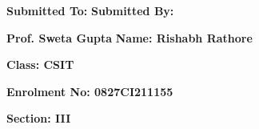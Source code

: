 \documentclass[12pt,,a4paper]{article}
\begin{document}







\vspace*{2cm}

\textbf{\fontsize{14}{\baselineskip}\selectfont Submitted To:} 
 \hspace{\fill} 
\textbf{\fontsize{14}{\baselineskip}\selectfont Submitted By:} 


\bigskip

\textbf{\fontsize{14}{\baselineskip}\selectfont Prof. Sweta Gupta}
\hspace{\fill}
\textbf{\fontsize{14}{\baselineskip}\selectfont Name: Rishabh Rathore }

\bigskip

\hspace{8cm}\textbf{\fontsize{14}{\baselineskip}\selectfont Class: CSIT}

\bigskip


\hspace{8cm}\textbf{\fontsize{14}{\baselineskip}\selectfont Enrolment No: 0827CI211155}

\bigskip

\hspace{8cm}\textbf{\fontsize{14}{\baselineskip}\selectfont Section: III}

\clearpage

\end{document}
